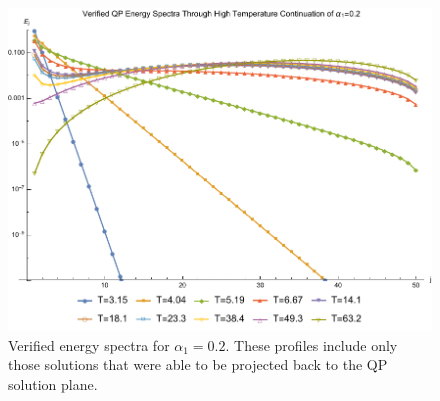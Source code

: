 \documentclass[letterpaper,11pt]{article}
\begin{document}
\begin{figure}[h]
\centering
  \includegraphics[scale=0.75]{a20HighTE} 
  \caption{Verified energy spectra for $\alpha_1 = 0.2$. These profiles include only those solutions that were able to be projected back to the QP solution plane.}
  \label{fig: verified}
\end{figure}









\appendix
\end{document}
